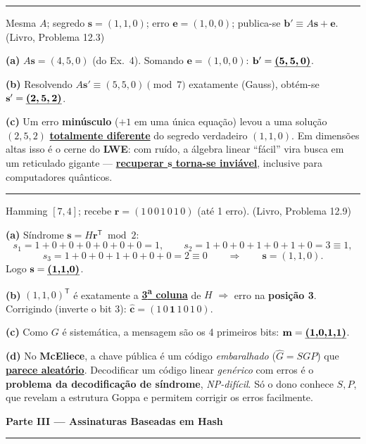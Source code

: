 \documentclass[11pt,a4paper]{article}
\newcommand{\livro}[1]{{\footnotesize\color{black!50}(Livro, Problema #1)}}
\newcommand{\alert}[1]{\textbf{\uline{#1}}}
\newcommand{\parte}[1]{%
    \par\vspace{1.6em}\noindent
    {\large\bfseries\color{red!55!black}#1}%
    \par\nobreak\vspace{-0.4em}\noindent
    {\color{red!45!black}\rule{\linewidth}{1.0pt}}%
    \par\nobreak\vspace{0.2em}
}
\newcommand{\exercicio}[1]{%
    \Needspace{8\baselineskip}%
    \par\vspace{1.2em}
    \noindent
    {\color{black!55}\rule[-0.25em]{3pt}{1.6em}}%
    \hspace{0.6em}{\Large\bfseries Exerc\'{i}cio #1}
    \par\vspace{-0.4em}
    \noindent{\color{black!35}\rule{\textwidth}{0.4pt}}
    \par\vspace{0.35em}
}
\newenvironment{resposta}{%
    \begin{respostabox}
    \color{red!70!black}\sloppy
}{%
    \end{respostabox}
}
\begin{document}
\exercicio{5}
Mesma $A$; segredo $\mathbf{s}=(1,1,0)$; erro $\mathbf{e}=(1,0,0)$; publica-se $\mathbf{b}'\equiv A\mathbf{s}+\mathbf{e}$. \livro{12.3}
\begin{resposta}
\textbf{(a)} $A\mathbf{s} = (4,5,0)$ (do Ex.~4). Somando $\mathbf{e}=(1,0,0)$: $\mathbf{b}' = \alert{(5,\,5,\,0)}$.

\textbf{(b)} Resolvendo $A\mathbf{s}'\equiv(5,5,0)\pmod 7$ exatamente (Gauss), obt\'{e}m-se $\mathbf{s}' = \alert{(2,\,5,\,2)}$.

\textbf{(c)} Um erro \textbf{min\'{u}sculo} ($+1$ em uma \'{u}nica equa\c{c}\~{a}o) levou a uma solu\c{c}\~{a}o $(2,5,2)$ \alert{totalmente diferente} do segredo verdadeiro $(1,1,0)$. Em dimens\~{o}es altas isso \'{e} o cerne do \textbf{LWE}: com ru\'{i}do, a \'{a}lgebra linear ``f\'{a}cil'' vira busca em um reticulado gigante --- \alert{recuperar $\mathbf{s}$ torna-se invi\'{a}vel}, inclusive para computadores qu\^{a}nticos.
\end{resposta}

\exercicio{6}
Hamming $[7,4]$; recebe $\mathbf{r}=(1\,0\,0\,1\,0\,1\,0)$ (at\'{e} 1 erro). \livro{12.9}
\begin{resposta}
\textbf{(a)} S\'{i}ndrome $\mathbf{s}=H\mathbf{r}^{\mathsf T}\bmod 2$:
\[
s_1 = 1{+}0{+}0{+}0{+}0{+}0{+}0 = 1,\qquad
s_2 = 1{+}0{+}0{+}1{+}0{+}1{+}0 = 3\equiv 1,
\]
\[
s_3 = 1{+}0{+}0{+}1{+}0{+}0{+}0 = 2\equiv 0
\qquad\Rightarrow\qquad \mathbf{s} = (1,1,0).
\]
Logo $\mathbf{s} = \alert{(1,1,0)}$.

\textbf{(b)} $(1,1,0)^{\mathsf T}$ \'{e} exatamente a \alert{3\textsuperscript{a} coluna} de $H$ $\Rightarrow$ erro na \textbf{posi\c{c}\~{a}o 3}. Corrigindo (inverte o bit 3): $\hat{\mathbf{c}} = (1\,0\,\mathbf{1}\,1\,0\,1\,0)$.

\textbf{(c)} Como $G$ \'{e} sistem\'{a}tica, a mensagem s\~{a}o os 4 primeiros bits: $\mathbf{m} = \alert{(1,0,1,1)}$.

\textbf{(d)} No \textbf{McEliece}, a chave p\'{u}blica \'{e} um c\'{o}digo \emph{embaralhado} ($\hat{G}=SGP$) que \alert{parece aleat\'{o}rio}. Decodificar um c\'{o}digo linear \emph{gen\'{e}rico} com erros \'{e} o \textbf{problema da decodifica\c{c}\~{a}o de s\'{i}ndrome}, \emph{NP-dif\'{i}cil}. S\'{o} o dono conhece $S,P$, que revelam a estrutura Goppa e permitem corrigir os erros facilmente.
\end{resposta}

\parte{Parte III --- Assinaturas Baseadas em Hash}
\end{document}
